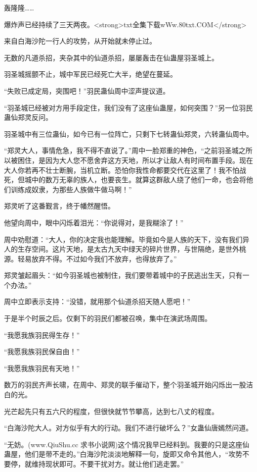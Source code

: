 
\begin{this_body}

轰隆隆……

爆炸声已经持续了三天两夜。<strong>txt全集下载wWw.80txt.COM</strong>

来自白海沙陀一行人的攻势，从开始就未停止过。

无数的凡道杀招，夹杂其中的仙道杀招，屡屡轰击在仙蛊屋羽圣城上。

羽圣城摇颤不止，城中军民已经死亡大半，绝望在蔓延。

“失败已成定局，突围吧！”羽民蛊仙周中涩声提议道。

“羽圣城已经被对方用手段定住，我们没有了这座仙蛊屋，如何突围？”另一位羽民蛊仙郑灵反问。

羽圣城中有三位蛊仙，如今已有一位阵亡，只剩下七转蛊仙郑灵，六转蛊仙周中。

“郑灵大人，事情危急，我不得不直说了。”周中一脸郑重的神色，“之前羽圣城之所以被困住，是因为大人您不愿舍弃这方天地，所以才让敌人有时间布置手段。现在大人你若再不壮士断腕，当机立断。恐怕你我性命都要交代在这里了！我不怕战死，但城中的数万无辜的族人，也要丧生。就算这群敌人绕了他们一命，也会将他们训练成奴隶，为那些人族做牛做马啊！”

郑灵听了这番觐言，终于幡然醒悟。

他望向周中，眼中闪烁着泪光：“你说得对，是我糊涂了！”

周中劝慰道：“大人，你的决定我也能理解。毕竟如今是人族的天下，没有我们异人的生存空间。这片天地，是太古九天中绿天的碎片世界，与世隔绝，是世外桃源。轻易放弃不得。不过如今我们不放弃，也得放弃了。”

郑灵皱起眉头：“如今羽圣城也被制住，我们要带着城中的子民逃出生天，只有一个办法。”

周中立即表示支持：“没错，就用那个仙道杀招天随人愿吧！”

于是半个时辰之后。仅剩下的羽民们都被召唤，集中在演武场周围。

“我愿我族羽民得生存！”

“我愿我族羽民保自由！”

“我愿我族羽民有天地！”

数万的羽民齐声长啸，在周中、郑灵的联手催动下，整个羽圣城开始闪烁出一股洁白的光。

光芒起先只有五六尺的程度，但很快就节节攀高，达到七八丈的程度。

“白海沙陀大人。对方似乎有大的行动。我们不进行破坏么？”女蛊仙唐嫣然问道。

“无妨。(www.QiuShu.cc 求书小说网)这个情况我早已经料到。我要的只是这座仙蛊屋，他们是带不走的。”白海沙陀淡淡地解释一句，旋即又命令其他人，“攻势不要停，就维持现状即可。不要干扰对方。就让他们逃走罢。”


\end{this_body}
